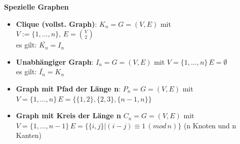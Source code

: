 \documentclass[12pt,a4paper]{article}
\begin{document}
\begin{figure}[H]
\end{figure}
\textbf{Spezielle Graphen}
\begin{itemize}
\item \textbf{Clique (vollst. Graph)}: $K_n = G = (V,E)$ mit\\
$ V := \{1,...,n\}, \, E = \binom{V}{2}$\\
es gilt: $\bar{K_n} = I_n$
\item \textbf{Unabhängiger Graph}: $I_n = G = (V,E)$ mit $V = \{1,...,n \} \, E = \emptyset$\\
es gilt: $\bar{I_n} = K_n$
\item \textbf{Graph mit Pfad der Länge n}: $P_n = G = (V, E)$ mit  $V = \{1,...,n \} \, E = \{\{1, 2\},\{2, 3\}, \{n-1, n\}\}$
\item \textbf{Graph mit Kreis der Länge n} $C_n = G = (V, E)$ mit $V = \{1,...,n-1 \} \, E = \{\{i, j\} \vert (i-j) \equiv 1\, (mod\, n) \}$ (n Knoten und n Kanten)

\end{itemize}
\end{document}
